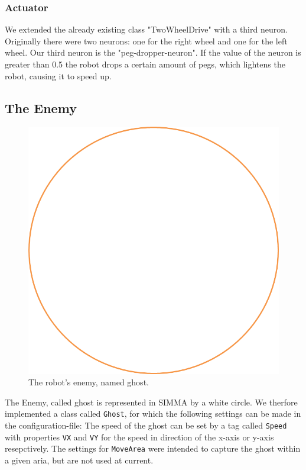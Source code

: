 \documentclass[12pt,fleqn,a4paper]{article}
\begin{document}
\subsubsection{Actuator}
We extended the already existing class "TwoWheelDrive" with a third neuron. Originally there were two neurons: one for the right wheel and one for the left wheel. Our third neuron is the "peg-dropper-neuron". If the value of the neuron is greater than 0.5 the robot drops a certain amount of pegs, which lightens the robot, causing it to speed up.

\subsection{The Enemy}
\begin{figure}[h]
\centering
\includegraphics[scale=0.3]{img/ghost.png}
\caption{The robot's enemy, named ghost.}
\label{fig:ghost}
\end{figure}

The Enemy, called ghost is represented in SIMMA by a white circle. We therfore implemented a class called \texttt{Ghost}, for which the following settings can be made in the configuration-file: The speed of the ghost can be set by a tag called \texttt{Speed} with properties \texttt{VX} and \texttt{VY} for the speed in direction of the x-axis or y-axis resepctively. The settings for \texttt{MoveArea} were intended to capture the ghost within a given aria, but are not used at current.
\end{document}

